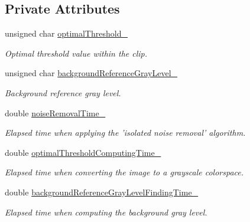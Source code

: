 \subsection*{Private Attributes}
\begin{CompactItemize}
\item 
\hypertarget{class_preprocessor_865b1e28dd9535b96f70727a550104fe}{
unsigned char \hyperlink{class_preprocessor_865b1e28dd9535b96f70727a550104fe}{optimalThreshold\_\-}}
\label{class_preprocessor_865b1e28dd9535b96f70727a550104fe}

\begin{CompactList}\small\item\em Optimal threshold value within the clip. \item\end{CompactList}\item 
\hypertarget{class_preprocessor_2c9e44ff6522b2ce35d6bc6161ad2680}{
unsigned char \hyperlink{class_preprocessor_2c9e44ff6522b2ce35d6bc6161ad2680}{backgroundReferenceGrayLevel\_\-}}
\label{class_preprocessor_2c9e44ff6522b2ce35d6bc6161ad2680}

\begin{CompactList}\small\item\em Background reference gray level. \item\end{CompactList}\item 
\hypertarget{class_preprocessor_386a5118bd982b2377c1fc5d67ebb7ac}{
double \hyperlink{class_preprocessor_386a5118bd982b2377c1fc5d67ebb7ac}{noiseRemovalTime\_\-}}
\label{class_preprocessor_386a5118bd982b2377c1fc5d67ebb7ac}

\begin{CompactList}\small\item\em Elapsed time when applying the 'isolated noise removal' algorithm. \item\end{CompactList}\item 
\hypertarget{class_preprocessor_d606fe1f0be7f7be60583f59278e2df6}{
double \hyperlink{class_preprocessor_d606fe1f0be7f7be60583f59278e2df6}{optimalThresholdComputingTime\_\-}}
\label{class_preprocessor_d606fe1f0be7f7be60583f59278e2df6}

\begin{CompactList}\small\item\em Elapsed time when converting the image to a grayscale colorspace. \item\end{CompactList}\item 
\hypertarget{class_preprocessor_140ea3fa7bbd4e8fef54912d65c4e926}{
double \hyperlink{class_preprocessor_140ea3fa7bbd4e8fef54912d65c4e926}{backgroundReferenceGrayLevelFindingTime\_\-}}
\label{class_preprocessor_140ea3fa7bbd4e8fef54912d65c4e926}

\begin{CompactList}\small\item\em Elapsed time when computing the background gray level. \item\end{CompactList}\end{CompactItemize}



